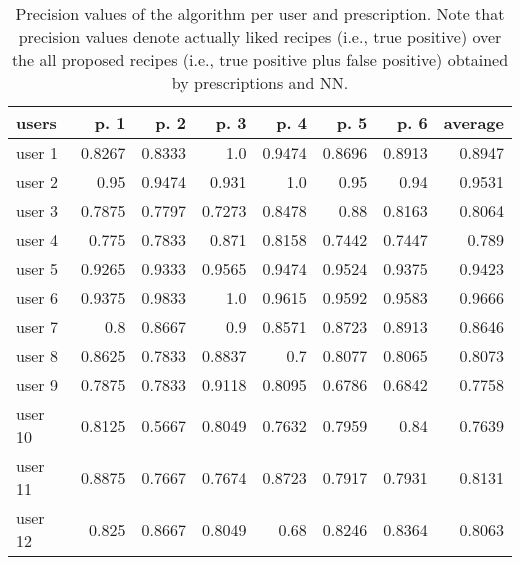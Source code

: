 \begin{table}%
    \centering
    \caption[Precision of proposed recipes with NN]{%
        Precision values of the algorithm per user and prescription. Note that precision values denote actually liked recipes (i.e., true positive) over the all proposed recipes (i.e., true positive plus false positive) obtained by prescriptions and NN.
    }
        \begin{tabular}{l||r|r|r|r|r|r||r}
           \textbf{users} & \textbf{p. 1} & \textbf{p. 2} & \textbf{p. 3} & \textbf{p. 4} & \textbf{p. 5} & \textbf{p. 6} & \textbf{average}\\
            \hline\hline
            user 1 & 0.8267 & 0.8333 & 1.0 & 0.9474 & 0.8696 & 0.8913 & 0.8947\\
            user 2 & 0.95 & 0.9474 & 0.931 & 1.0 & 0.95 & 0.94 & 0.9531\\
            user 3 & 0.7875 & 0.7797 & 0.7273 & 0.8478 & 0.88 & 0.8163 & 0.8064\\
            user 4 & 0.775 & 0.7833 & 0.871 & 0.8158 & 0.7442 & 0.7447 & 0.789\\
            user 5 & 0.9265 & 0.9333 & 0.9565 & 0.9474 & 0.9524 & 0.9375 & 0.9423\\
            user 6 & 0.9375 & 0.9833 & 1.0 & 0.9615 & 0.9592 & 0.9583 & 0.9666\\
            user 7 & 0.8 & 0.8667 & 0.9 & 0.8571 & 0.8723 & 0.8913 & 0.8646\\
            user 8 & 0.8625 & 0.7833 & 0.8837 & 0.7 & 0.8077 & 0.8065 & 0.8073\\
            user 9 & 0.7875 & 0.7833 & 0.9118 & 0.8095 & 0.6786 & 0.6842 & 0.7758\\
            user 10 & 0.8125 & 0.5667 & 0.8049 & 0.7632 & 0.7959 & 0.84 & 0.7639\\
            user 11 & 0.8875 & 0.7667 & 0.7674 & 0.8723 & 0.7917 & 0.7931 & 0.8131\\
            user 12 & 0.825 & 0.8667 & 0.8049 & 0.68 & 0.8246 & 0.8364 & 0.8063\\
        \end{tabular}
    \label{tab:proposed-recipes-stats-nn}
\end{table}

